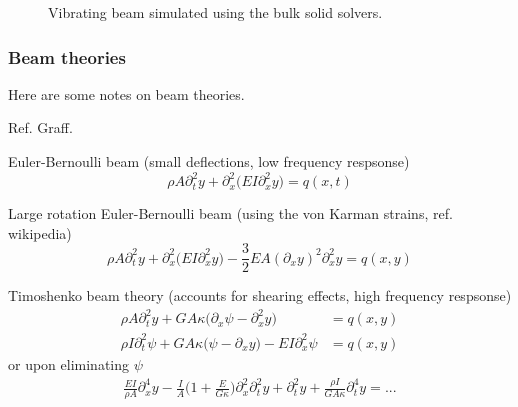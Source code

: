 {
\newcommand{\figWidtha}{16.cm}
\newcommand{\trimfiga}[2]{\trimPlotb{#1}{#2}{.0}{.125}{.4}{.4}}
\newcommand{\figWidthb}{10.cm}
\newcommand{\trimfigb}[2]{\trimPlotb{#1}{#2}{.05}{.1}{.05}{.1}}
\begin{figure}[hbt]
 \begin{center}
%
\end{center}
\caption{Vibrating beam simulated using the bulk solid solvers.}
\label{fig:beamEvolution}
\end{figure}
}





\subsubsection{Beam theories}

Here are some notes on beam theories. 

Ref. Graff. 

Euler-Bernoulli beam  (small deflections, low frequency respsonse)
\[
  \rho A \partial_t^2 y + \partial_x^2\big( E I \partial_x^2 y\big) = q(x,t) 
\]


Large rotation Euler-Bernoulli beam (using the von Karman strains, ref. wikipedia)
\[
  \rho A \partial_t^2 y + \partial_x^2\big( E I \partial_x^2 y\big) 
           - \frac{3}{2} E A (\partial_x y)^2  \partial_x^2 y  = q(x,y) 
\]


Timoshenko beam theory (accounts for shearing effects, high frequency respsonse)
\begin{align*}
  \rho A \partial_t^2 y + G A \kappa\Big(  \partial_x \psi - \partial_x^2 y \Big)  &= q(x,y)  \\
  \rho I \partial_t^2 \psi + G A \kappa\Big( \psi - \partial_x y \Big)  - E I \partial_x^2 \psi &= q(x,y) 
\end{align*}
or upon eliminating $\psi$
\begin{align*}
    \frac{EI}{\rho A}\partial_x^4 y - \frac{I}{A}\Big(1 +\frac{E}{G\kappa}\Big)\partial_x^2\partial_t^2 y + \partial_t^2 y 
             + \frac{\rho I}{G A \kappa}\partial_t^4 y = ...
\end{align*}
